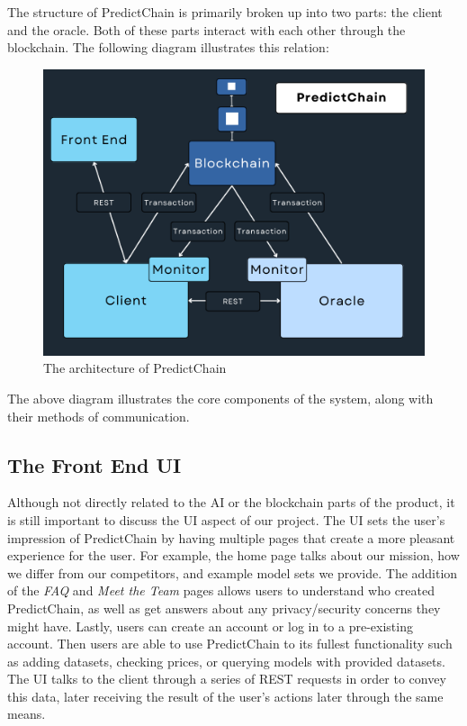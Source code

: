 \documentclass{ledger}
\begin{document}
The structure of PredictChain is primarily broken up into two parts: the client and the oracle.  Both of these parts
interact with each other through the blockchain.  The following diagram illustrates this relation:

\begin{figure}[H]
    \begin{center}
        \begin{minipage}{0.6\textwidth}
        \centering
        \includegraphics[width=\linewidth]{images/detailedDiagram}
        \caption{The architecture of PredictChain}\label{Fig:detailedDiagram}
    \end{minipage}\hfill
    \end{center}
\end{figure}

The above diagram illustrates the core components of the system, along with their methods of communication.

\subsection{The Front End UI}
Although not directly related to the AI or the blockchain parts of the product, it is still important to discuss the
UI aspect of our project. The UI sets the user's impression of PredictChain by having multiple pages that create a more
pleasant experience for the user. For example, the home page talks about our mission, how we differ from our
competitors, and example model sets we provide. The addition of the \textit{FAQ} and \textit{Meet the Team} pages
allows users to understand who created PredictChain, as well as get answers about any privacy/security concerns they
might have.  Lastly, users can create an account or log in to a pre-existing account. Then users are able to use
PredictChain to its fullest functionality such as adding datasets, checking prices, or querying models with provided
datasets.  The UI talks to the client through a series of REST requests in order to convey this data, later receiving the
result of the user's actions later through the same means.
\end{document}
